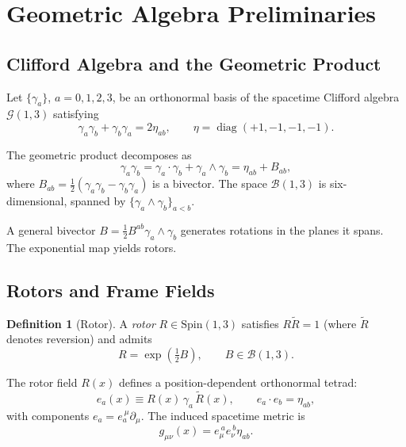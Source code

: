 \documentclass[11pt,a4paper]{article}
\numberwithin{equation}{section}
\theoremstyle{plain}
\theoremstyle{definition}
\newtheorem{definition}[theorem]{Definition}
\theoremstyle{remark}
\DeclareMathOperator{\diag}{diag}
\newcommand{\Spin}{\mathrm{Spin}}
\newcommand{\Cl}{\mathcal{G}}               %
\newcommand{\rev}[1]{\widetilde{#1}}        %
\newcommand{\bivec}{\mathcal{B}}            %
\begin{document}
\vspace{1em}

\section{Geometric Algebra Preliminaries}\label{sec:prelim}

\subsection{Clifford Algebra and the Geometric Product}

Let $\{\gamma_a\}$, $a=0,1,2,3$, be an orthonormal basis of the spacetime Clifford algebra $\Cl(1,3)$ satisfying
\begin{equation}
\gamma_a\gamma_b+\gamma_b\gamma_a=2\eta_{ab},\qquad \eta=\diag(+1,-1,-1,-1).
\end{equation}

The geometric product decomposes as
\begin{equation}
\gamma_a\gamma_b = \gamma_a\cdot\gamma_b + \gamma_a\wedge\gamma_b = \eta_{ab} + B_{ab},
\end{equation}
where $B_{ab}=\tfrac12(\gamma_a\gamma_b-\gamma_b\gamma_a)$ is a bivector. The space $\bivec(1,3)$ is six-dimensional, spanned by $\{\gamma_a\wedge\gamma_b\}_{a<b}$.

A general bivector $B=\tfrac12 B^{ab}\gamma_a\wedge\gamma_b$ generates rotations in the planes it spans. The exponential map yields rotors.

\subsection{Rotors and Frame Fields}

\begin{definition}[Rotor]
A \emph{rotor} $R\in\Spin(1,3)$ satisfies $R\rev{R}=1$ (where $\rev{R}$ denotes reversion) and admits
\begin{equation}
R=\exp\!\left(\tfrac12 B\right), \qquad B\in\bivec(1,3).
\end{equation}
\end{definition}

The rotor field $R(x)$ defines a position-dependent orthonormal tetrad:
\begin{equation}
e_a(x) \equiv R(x)\,\gamma_a\,\rev{R}(x), \qquad e_a\cdot e_b=\eta_{ab},
\end{equation}
with components $e_a=e_a^{\ \mu}\partial_\mu$. The induced spacetime metric is
\begin{equation}
g_{\mu\nu}(x)=e_\mu^{\ a}e_\nu^{\ b}\eta_{ab}.
\label{eq:metric-tetrad}
\end{equation}
\end{document}

